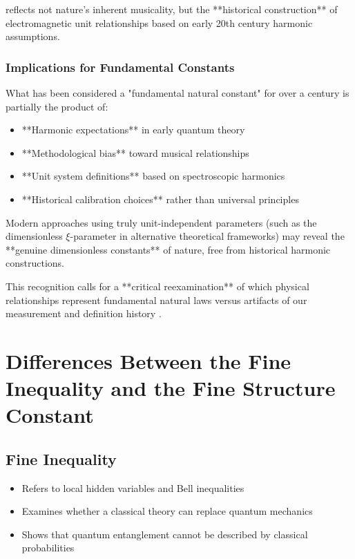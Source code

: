\documentclass[12pt,a4paper]{article}
\begin{document}
reflects not nature's inherent musicality, but the **historical construction** of electromagnetic unit relationships based on early 20th century harmonic assumptions.

\subsubsection{Implications for Fundamental Constants}

What has been considered a "fundamental natural constant" for over a century is partially the product of:
\begin{itemize}
	\item **Harmonic expectations** in early quantum theory
	\item **Methodological bias** toward musical relationships  
	\item **Unit system definitions** based on spectroscopic harmonics
	\item **Historical calibration choices** rather than universal principles
\end{itemize}

Modern approaches using truly unit-independent parameters (such as the dimensionless $\xi$-parameter in alternative theoretical frameworks) may reveal the **genuine dimensionless constants** of nature, free from historical harmonic constructions.

This recognition calls for a **critical reexamination** of which physical relationships represent fundamental natural laws versus artifacts of our measurement and definition history \cite{Weinberg1995, Parker2018}.
	\section{Differences Between the Fine Inequality and the Fine Structure Constant}
	
	\subsection{Fine Inequality}
	\begin{itemize}
		\item Refers to local hidden variables and Bell inequalities
		\item Examines whether a classical theory can replace quantum mechanics
		\item Shows that quantum entanglement cannot be described by classical probabilities
	\end{itemize}
	
\end{document}
